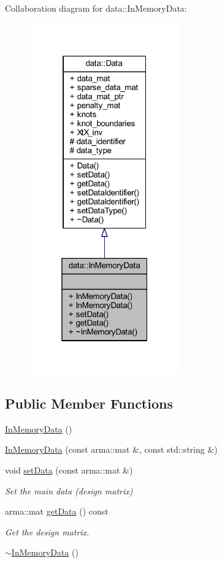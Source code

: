 Collaboration diagram for data\+:\+:In\+Memory\+Data\+:\nopagebreak
\begin{figure}[H]
\begin{center}
\leavevmode
\includegraphics[width=184pt]{classdata_1_1_in_memory_data__coll__graph}
\end{center}
\end{figure}
\subsection*{Public Member Functions}
\begin{DoxyCompactItemize}
\item 
\mbox{\hyperlink{classdata_1_1_in_memory_data_a85adf030d1a4a1f31f6d852c41750268}{In\+Memory\+Data}} ()
\item 
\mbox{\hyperlink{classdata_1_1_in_memory_data_af9bc156072099d40e45142e4c19f698c}{In\+Memory\+Data}} (const arma\+::mat \&, const std\+::string \&)
\item 
void \mbox{\hyperlink{classdata_1_1_in_memory_data_a0456d66f7930809211c75bcdd80a7bca}{set\+Data}} (const arma\+::mat \&)
\begin{DoxyCompactList}\small\item\em Set the main data (design matrix) \end{DoxyCompactList}\item 
arma\+::mat \mbox{\hyperlink{classdata_1_1_in_memory_data_ac0993c38a9633fa0f1ff787660b86c71}{get\+Data}} () const
\begin{DoxyCompactList}\small\item\em Get the design matrix. \end{DoxyCompactList}\item 
\mbox{\hyperlink{classdata_1_1_in_memory_data_a675c78a5c7537ca16b8ce86b3ea1f7b3}{$\sim$\+In\+Memory\+Data}} ()
\end{DoxyCompactItemize}
